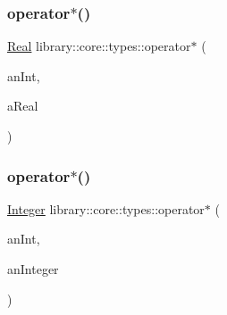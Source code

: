 \subsubsection{\texorpdfstring{operator$\ast$()}{operator*()}\hspace{0.1cm}{\footnotesize\ttfamily [1/2]}}
{\footnotesize\ttfamily \mbox{\hyperlink{classlibrary_1_1core_1_1types_1_1_real}{Real}} library\+::core\+::types\+::operator$\ast$ (\begin{DoxyParamCaption}\item[{const \mbox{\hyperlink{classlibrary_1_1core_1_1types_1_1_real_a9c5c8826b7e5a8e39544d23fea6c0e1c}{Real\+::\+Value\+Type}} \&}]{an\+Int,  }\item[{const \mbox{\hyperlink{classlibrary_1_1core_1_1types_1_1_real}{Real}} \&}]{a\+Real }\end{DoxyParamCaption})}

\mbox{\label{namespacelibrary_1_1core_1_1types_abc5a3a409f7959b3f0130b2cbb7c3310}} 
\subsubsection{\texorpdfstring{operator$\ast$()}{operator*()}\hspace{0.1cm}{\footnotesize\ttfamily [2/2]}}
{\footnotesize\ttfamily \mbox{\hyperlink{classlibrary_1_1core_1_1types_1_1_integer}{Integer}} library\+::core\+::types\+::operator$\ast$ (\begin{DoxyParamCaption}\item[{const \mbox{\hyperlink{classlibrary_1_1core_1_1types_1_1_integer_a623afb1580f870fd8a1997b1c12c917d}{Integer\+::\+Value\+Type}} \&}]{an\+Int,  }\item[{const \mbox{\hyperlink{classlibrary_1_1core_1_1types_1_1_integer}{Integer}} \&}]{an\+Integer }\end{DoxyParamCaption})}

\mbox{\label{namespacelibrary_1_1core_1_1types_a6866c9236ccc6c22dd6d30e9b64d5aba}} 
